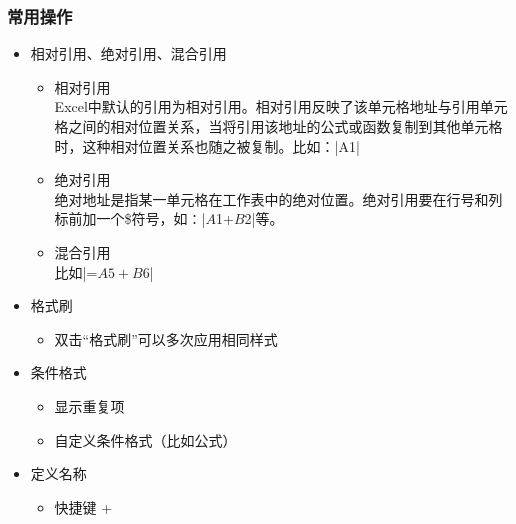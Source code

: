 \begin{frame}[fragile]
\frametitle{常用操作}
\begin{itemize}
	\item<+-> 相对引用、绝对引用、混合引用
		\begin{itemize}
			\item 相对引用\\
			Excel中默认的引用为相对引用。相对引用反映了该单元格地址与引用单元格之间的相对位置关系，当将引用该地址的公式或函数复制到其他单元格时，这种相对位置关系也随之被复制。比如：|A1|\\
			
			\item 绝对引用\\
			绝对地址是指某一单元格在工作表中的绝对位置。绝对引用要在行号和列标前加一个\$符号，如∶|$A$1+$B$2|等。
			\item 混合引用\\
			比如|=$A5+B$6|
		\end{itemize}
	\item<+-> 格式刷
		\begin{itemize}
			\item 双击“格式刷”可以多次应用相同样式
		\end{itemize}
	\item<+-> 条件格式
	\begin{itemize}
		\item 显示重复项
		\item 自定义条件格式（比如公式）
	\end{itemize}
	\item<+-> 定义名称
	\begin{itemize}
		\item 快捷键 + 
	\end{itemize}

\end{itemize}
\end{frame}


